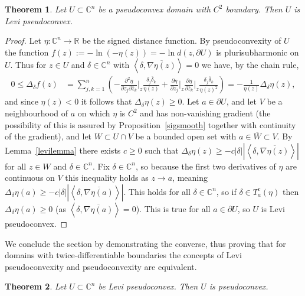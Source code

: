 \documentclass[11pt,a4paper, final, twoside]{article}
\newtheorem{theorem}{Theorem}
\numberwithin{equation}{section}
\newcommand{\C}{\mathbb C}
\newcommand{\R}{\mathbb R}
\newcommand{\con}[1]{\overline{#1}}
\newcommand{\clos}[1]{\overline{#1}}
\newcommand{\bd}{\partial}
\newcommand{\emetric}{d}
\newcommand{\cts}{C}
\renewcommand{\sp}[2]{\left<#1,#2\right>}
\newcommand{\sprod}[2]{\sp{#1}{#2}}
\newcommand{\cgrad}[1]{\nabla #1}
\begin{document}
\begin{theorem}
\label{pslevi}
Let $U\subset\C^n$ be a pseudoconvex domain with $\cts^2$ boundary. Then $U$ is Levi pseudoconvex.
\end{theorem}
\begin{proof}
Let $\eta\colon\C^n\to\R$ be the signed distance function.
By pseudoconvexity of $U$
the function $f(z):=-\ln (-\eta(z))=-\ln\emetric(z,\bd U)$ is plurisubharmonic on $U$. Thus for $z\in U$ and $\delta\in\C^n$ with $\sprod{\delta}{\con{\cgrad{\eta}(z)}}=0$ we have, by the chain rule,
\begin{align*}
 0 \leq \Delta_\delta f(z)&=\sum_{j,k=1}^n \left(-\frac{\partial^2\eta}{\partial z_j\partial\con z_k}\bigg|_z \frac{\delta_j\con\delta_k}{\eta(z)}+\frac{\partial \eta}{\partial z_j}\bigg|_z\frac{\partial \eta}{\partial\con z_k}\bigg|_z\frac{\delta_j\con\delta_k}{\eta(z)^2}\right) =-\frac{1}{\eta(z)}\Delta_\delta \eta(z),
\end{align*}
and since $\eta(z)<0$ it follows that $\Delta_\delta\eta(z)\geq 0$. Let $a\in\bd U$, and let $V$ be a neighbourhood of $a$ on which $\eta$ is $\cts^2$ and has non-vanishing gradient (the possibility of this
is assured by Proposition~\ref{sigsmooth} together with continuity of the gradient), and let $W\subset U\cap V$ be a bounded open set with $a\in\clos{W}\subset V$. By Lemma~\ref{levilemma} there exists $c\geq 0$
such that $\Delta_\delta\eta(z)\geq -c|\delta|\left|\sprod{\delta}{\con{\cgrad{\eta}(z)}}\right|$ for all $z\in W$ and $\delta\in\C^n$. Fix $\delta\in\C^n$, so 
because the first two derivatives of $\eta$ are continuous on $V$ this inequality holds as $z\to a$, meaning $\Delta_\delta\eta(a)\geq -c|\delta|\left|\sprod{\delta}{\con{\cgrad{\eta}(a)}}\right|$.
This holds for all $\delta\in\C^n$, so if $\delta\in T^c_a(\eta)$ then $\Delta_\delta\eta(a)\geq 0$ (as $\sprod{\delta}{\con{\cgrad{\eta}(a)}}=0$). This is true for all $a\in\bd U$, so
$U$ is Levi pseudoconvex.
\end{proof}
We conclude the section by demonstrating the converse, thus proving that for domains with twice-differentiable boundaries the concepts of Levi pseudoconvexity and pseudoconvexity are equivalent.
\begin{theorem}
\label{leviisps}
Let $U\subset\C^n$ be Levi pseudoconvex. Then $U$ is pseudoconvex.
\end{theorem}
\end{document}

